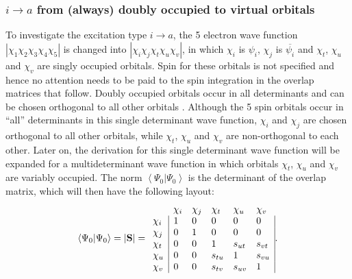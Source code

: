 \subsubsection{\label{ch2.sec.i-a}$i \rightarrow a$ from (always) doubly occupied to virtual orbitals}

To investigate the excitation type $i \rightarrow a$, the 5 electron wave function $|\chi_1\chi_2\chi_3\chi_4\chi_5|$ is changed into $|\chi_i\chi_j\chi_t\chi_u\chi_v|$, in which $\chi_i$ is $\psi_i$, $\chi_j$ is $\overline{\psi_i}$ and $\chi_t$, $\chi_u$ and $\chi_v$ are singly occupied orbitals. Spin for these orbitals is not specified and hence no attention needs to be paid to the spin integration in the overlap matrices that follow. Doubly occupied orbitals occur in all determinants and can be chosen orthogonal to all other orbitals \cite{koos1}. Although the 5 spin orbitals occur in ``all'' determinants in this single determinant wave function, $\chi_i$ and $\chi_j$ are chosen orthogonal to all other orbitals, while $\chi_t$, $\chi_u$ and $\chi_v$ are non-orthogonal to each other. Later on, the derivation for this single determinant wave function will be expanded for a multideterminant wave function in which orbitals $\chi_t$, $\chi_u$ and $\chi_v$ are variably occupied. The norm $\left < \Psi_0 | \Psi_0 \right>$ is the determinant of the overlap matrix, which will then have the following layout:
\begin{equation}
\left < \Psi_0 | \Psi_0 \right> = | \mathbf{S} | =
\begin{array}{llllll}
 &  \chi_i & \chi_j & \chi_t & \chi_u & \chi_v \\
 \chi_i & \multicolumn{1}{|l}{ 1 } & 0 & 0 & 0 & \multicolumn{1}{l|}{ 0 } \\
 \chi_j & \multicolumn{1}{|l}{ 0 } & 1 & 0 & 0 & \multicolumn{1}{l|}{ 0 } \\
 \chi_t & \multicolumn{1}{|l}{ 0 } & 0 & 1 & s_{ut} & \multicolumn{1}{l|}{s_{vt}} \\
 \chi_u & \multicolumn{1}{|l}{ 0 } & 0 & s_{tu} & 1 & \multicolumn{1}{l|}{s_{vu}} \\
 \chi_v & \multicolumn{1}{|l}{ 0 } & 0 & s_{tv} & s_{uv} & \multicolumn{1}{l|}{1}
\end{array}.
\label{ch2.eq.s0}
\end{equation}


